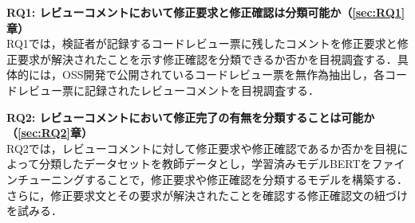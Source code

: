 \documentclass[T,J]{fose} %
\newcommand{\RQOne}{レビューコメントにおいて修正要求と修正確認は分類可能か}
\newcommand{\RQTwo}{レビューコメントにおいて修正完了の有無を分類することは可能か}
\begin{document}








\noindent\textbf{RQ1: \RQOne（\ref{sec:RQ1}章）}\\
RQ1では，検証者が記録するコードレビュー票に残したコメントを修正要求と修正要求が解決されたことを示す修正確認を分類できるか否かを目視調査する．具体的には，OSS開発で公開されているコードレビュー票を無作為抽出し，各コードレビュー票に記録されたレビューコメントを目視調査する．

\noindent\textbf{RQ2: \RQTwo（\ref{sec:RQ2}章）}\\
RQ2では，レビューコメントに対して修正要求や修正確認であるか否かを目視によって分類したデータセットを教師データとし，学習済みモデルBERTをファインチューニングすることで，修正要求や修正確認を分類するモデルを構築する．さらに，修正要求文とその要求が解決されたことを確認する修正確認文の紐づけを試みる．
\end{document}
